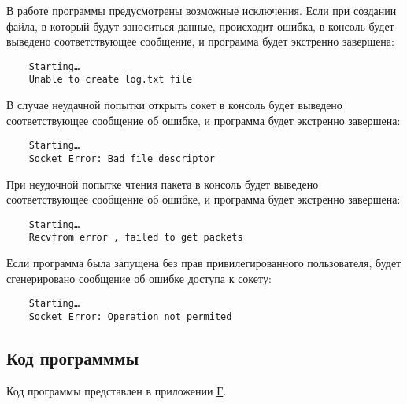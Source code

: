 В работе программы предусмотрены возможные исключения. Если при 
создании файла, в который будут заноситься данные, происходит ошибка, в 
консоль будет выведено соответствующее сообщение\cite{linux_prog}, и программа будет 
экстренно завершена:
\begin{verbatim}
    Starting…
    Unable to create log.txt file
\end{verbatim}


В случае неудачной попытки открыть сокет в консоль будет выведено
соответствующее сообщение об ошибке\cite{linux_prog}, и программа будет экстренно
завершена:
\begin{verbatim}
    Starting…
    Socket Error: Bad file descriptor
\end{verbatim}


При неудочной попытке чтения пакета в консоль будет выведено
соответствующее сообщение об ошибке\cite{linux_prog}, и программа будет экстренно
завершена:
\begin{verbatim}
    Starting…
    Recvfrom error , failed to get packets
\end{verbatim}


Если программа была запущена без прав привилегированного пользователя,
будет сгенерировано сообщение об ошибке доступа к сокету:
\begin{verbatim}
    Starting…
    Socket Error: Operation not permited     
\end{verbatim}


\subsection{Код программмы}
Код программы представлен в приложении \hyperref[sec:appendix:code]{Г}.
